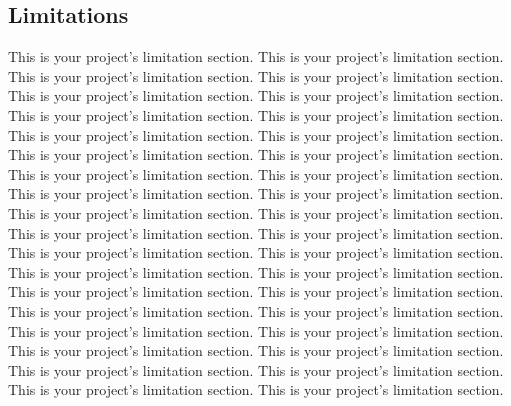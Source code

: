 {
\begin{doublespacing}
\begin{flushleft}

\section{Limitations}
This is your project's limitation section. This is your project's limitation section. This is your project's limitation section. This is your project's limitation section. This is your project's limitation section. This is your project's limitation section. This is your project's limitation section. This is your project's limitation section. This is your project's limitation section. This is your project's limitation section. This is your project's limitation section. This is your project's limitation section. This is your project's limitation section. This is your project's limitation section. This is your project's limitation section. This is your project's limitation section. This is your project's limitation section. This is your project's limitation section. This is your project's limitation section. This is your project's limitation section. This is your project's limitation section. This is your project's limitation section. This is your project's limitation section. This is your project's limitation section. This is your project's limitation section. This is your project's limitation section. This is your project's limitation section. This is your project's limitation section. This is your project's limitation section. This is your project's limitation section. This is your project's limitation section. This is your project's limitation section. This is your project's limitation section. This is your project's limitation section. This is your project's limitation section. This is your project's limitation section. 


\end{flushleft}
\end{doublespacing}
}